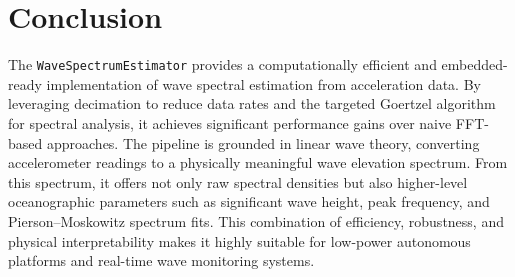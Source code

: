 \documentclass[11pt]{article}
\begin{document}
\section{Conclusion}
The \texttt{WaveSpectrumEstimator} provides a computationally efficient and embedded-ready implementation of wave spectral estimation from acceleration data. By leveraging decimation to reduce data rates and the targeted Goertzel algorithm for spectral analysis, it achieves significant performance gains over naive FFT-based approaches. The pipeline is grounded in linear wave theory, converting accelerometer readings to a physically meaningful wave elevation spectrum. From this spectrum, it offers not only raw spectral densities but also higher-level oceanographic parameters such as significant wave height, peak frequency, and Pierson--Moskowitz spectrum fits. This combination of efficiency, robustness, and physical interpretability makes it highly suitable for low-power autonomous platforms and real-time wave monitoring systems.

%
%
\end{document}
